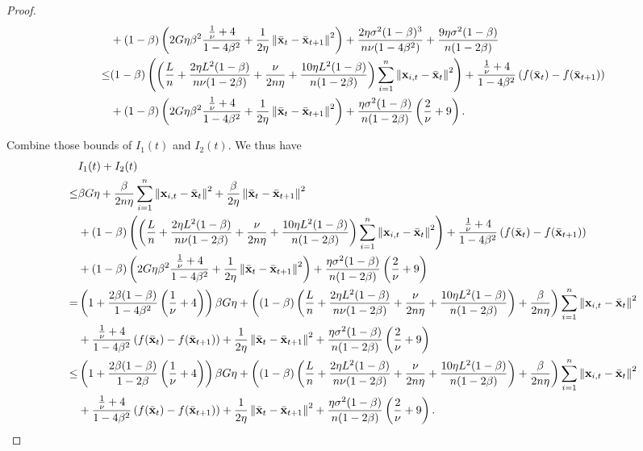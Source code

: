 \documentclass{article}
\begin{document}
\begin{proof}
\begin{align}
&+ (1-\beta) \left(  2G\eta\beta^2\frac{\frac{1}{\nu} + 4}{1-4\beta^2} +  \frac{1}{2\eta} \left\lVert \bar{{\bf x}}_t - \bar{{\bf x}}_{t+1}\right\rVert^2  \right) + \frac{2\eta \sigma^2 (1-\beta)^3}{n\nu(1-4\beta^2)}+\frac{9\eta \sigma^2(1-\beta)}{n(1-2\beta)} \\ \nonumber
\le & (1-\beta) \left(  \left(  \frac{L}{n} + \frac{2\eta L^2(1-\beta)}{n\nu(1-2\beta)} + \frac{\nu}{2n\eta} + \frac{10\eta L^2(1-\beta)}{n(1-2\beta)}  \right)\sum_{i=1}^n\left\lVert{\bf x}_{i,t} - \bar{{\bf x}}_t \right\rVert^2  \right) + \frac{\frac{1}{\nu} + 4}{1-4\beta^2}\left( f(\bar{{\bf x}}_t) - f(\bar{{\bf x}}_{t+1})  \right)\\ \nonumber 
&+ (1-\beta) \left(  2G\eta\beta^2\frac{\frac{1}{\nu} + 4}{1-4\beta^2} +  \frac{1}{2\eta} \left\lVert \bar{{\bf x}}_t - \bar{{\bf x}}_{t+1}\right\rVert^2  \right) +\frac{\eta \sigma^2(1-\beta)}{n(1-2\beta)}\left( \frac{2}{\nu}+9 \right).
\end{align}





Combine those bounds of $I_1(t)$ and $I_2(t)$. We thus have
\begin{align}
\nonumber
& I_1(t) + I_2(t) \\ \nonumber 
\le & \beta G \eta + \frac{\beta}{2n\eta }\sum_{i=1}^n \left\lVert{\bf x}_{i,t} - \bar{{\bf x}}_t\right\rVert^2 + \frac{\beta }{2\eta } \left\lVert\bar{{\bf x}}_t - \bar{{\bf x}}_{t+1}\right\rVert^2 \\ \nonumber
& + (1-\beta) \left(  \left(  \frac{L}{n} + \frac{2\eta L^2(1-\beta)}{n\nu(1-2\beta)} + \frac{\nu}{2n\eta} + \frac{10\eta L^2(1-\beta)}{n(1-2\beta)}  \right)\sum_{i=1}^n\left\lVert{\bf x}_{i,t} - \bar{{\bf x}}_t \right\rVert^2  \right) + \frac{\frac{1}{\nu} + 4}{1-4\beta^2}\left( f(\bar{{\bf x}}_t) - f(\bar{{\bf x}}_{t+1})  \right)\\ \nonumber 
&+ (1-\beta) \left(  2G\eta\beta^2\frac{\frac{1}{\nu} + 4}{1-4\beta^2} +  \frac{1}{2\eta} \left\lVert \bar{{\bf x}}_t - \bar{{\bf x}}_{t+1}\right\rVert^2  \right) + \frac{\eta \sigma^2(1-\beta)}{n(1-2\beta)}\left( \frac{2}{\nu}+9 \right) \\ \nonumber
= & \left( 1 + \frac{2\beta(1-\beta)}{1-4\beta^2}\left( \frac{1}{\nu}+4 \right) \right)\beta G \eta + \left(  (1-\beta)  \left(  \frac{L}{n} + \frac{2\eta L^2(1-\beta)}{n\nu(1-2\beta)} + \frac{\nu}{2n\eta} + \frac{10\eta L^2(1-\beta)}{n(1-2\beta)}  \right) + \frac{\beta}{2n\eta}  \right)\sum_{i=1}^n\left\lVert{\bf x}_{i,t} - \bar{{\bf x}}_t \right\rVert^2 \\ \nonumber 
&+ \frac{\frac{1}{\nu} + 4}{1-4\beta^2}\left( f(\bar{{\bf x}}_t) - f(\bar{{\bf x}}_{t+1}) \right) + \frac{1}{2\eta}\left\lVert \bar{{\bf x}}_t - \bar{{\bf x}}_{t+1}\right\rVert^2 + \frac{\eta \sigma^2 (1-\beta)}{n(1-2\beta)}\left( \frac{2}{\nu}+9 \right)\\ \nonumber
\le & \left( 1 + \frac{2\beta(1-\beta)}{1-2\beta}\left( \frac{1}{\nu}+4 \right) \right)\beta G \eta + \left(  (1-\beta)  \left(  \frac{L}{n} + \frac{2\eta L^2(1-\beta)}{n\nu(1-2\beta)} + \frac{\nu}{2n\eta} + \frac{10\eta L^2(1-\beta)}{n(1-2\beta)}  \right) + \frac{\beta}{2n\eta}  \right)\sum_{i=1}^n\left\lVert{\bf x}_{i,t} - \bar{{\bf x}}_t \right\rVert^2 \\ \nonumber 
&+ \frac{\frac{1}{\nu} + 4}{1-4\beta^2}\left( f(\bar{{\bf x}}_t) - f(\bar{{\bf x}}_{t+1}) \right) + \frac{1}{2\eta}\left\lVert \bar{{\bf x}}_t - \bar{{\bf x}}_{t+1}\right\rVert^2 + \frac{\eta \sigma^2 (1-\beta)}{n(1-2\beta)}\left( \frac{2}{\nu}+9 \right).
\end{align}



\end{proof}
\end{document}
